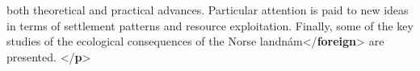 \begin{shaded}
\hspace*{1em}\hspace*{1em}\hspace*{1em}\hspace*{1em} both theoretical and practical advances.\mbox{}\newline 
\hspace*{1em}\hspace*{1em}\hspace*{1em}\hspace*{1em} Particular attention is paid to new\mbox{}\newline 
\hspace*{1em}\hspace*{1em}\hspace*{1em}\hspace*{1em} ideas in terms of settlement patterns\mbox{}\newline 
\hspace*{1em}\hspace*{1em}\hspace*{1em}\hspace*{1em} and resource exploitation. Finally,\mbox{}\newline 
\hspace*{1em}\hspace*{1em}\hspace*{1em}\hspace*{1em} some of the key studies of the ecological\mbox{}\newline 
\hspace*{1em}\hspace*{1em}\hspace*{1em}\hspace*{1em} consequences of the Norse\mbox{}\newline 
\hspace*{1em}landnám{</\textbf{foreign}>} \mbox{}\newline 
\hspace*{1em}\hspace*{1em}\hspace*{1em}\hspace*{1em} are presented. {</\textbf{p}>}\mbox{}\newline 
{}\mbox{}\newline 
{}\mbox{}\newline 

\end{shaded}

